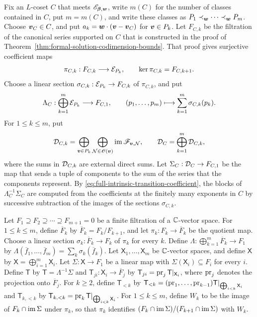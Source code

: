 Fix an \(L\)-coset \(C\) that meets \(\mathscr E_{\boldsymbol{\beta},\boldsymbol{w}}\), write \(m(C)\) for the number of classes contained in \(C\), put \(m=m(C)\), and write these classes as \(P_1\prec_{\boldsymbol{w}}\cdots\prec_{\boldsymbol{w}}P_m\).
Choose \(\boldsymbol{v}_C\in C\), and put \(a_k=\boldsymbol{w}\cdot(\boldsymbol{v}-\boldsymbol{v}_C)\) for \(\boldsymbol{v}\in P_k\).
Let \(F_{C,k}\) be the filtration of the canonical series supported on \(C\) that is constructed in the proof of Theorem~\ref{thm:formal-solution-codimension-bounds}.
That proof gives surjective coefficient maps
\begin{equation}
	\pi_{C,k}:F_{C,k}\longrightarrow
	\mathcal E_{P_k},
	\qquad
	\ker\pi_{C,k}=F_{C,k+1}.
	\label{eq:formal-transition-quotient-map}
\end{equation}
Choose a linear section \(\sigma_{C,k}:\mathcal E_{P_k}\to F_{C,k}\) of \(\pi_{C,k}\), and put
\begin{equation}
	\Lambda_C:
	\bigoplus_{k=1}^m\mathcal E_{P_k}
	\longrightarrow F_{C,1},
	\qquad
	(p_1,\ldots,p_m)
	\longmapsto
	\sum_{k=1}^m\sigma_{C,k}(p_k).
	\label{eq:formal-transition-lifting-map}
\end{equation}
For \(1\leq k\leq m\), put
\begin{equation}
	\mathcal D_{C,k}
	=
	\bigoplus_{\boldsymbol{v}\in P_k}
	\bigoplus_{\mathcal N\in\mathscr O(\boldsymbol{v})}
	\operatorname{im}\mathscr F_{\boldsymbol{v},\mathcal N},
	\qquad
	\mathcal D_C
	=
	\bigoplus_{k=1}^m\mathcal D_{C,k},
	\label{eq:formal-transition-source}
\end{equation}
where the sums in \(\mathcal D_{C,k}\) are external direct sums.
Let \(\Sigma_C:\mathcal D_C\to F_{C,1}\) be the map that sends a tuple of components to the sum of the series that the components represent.
By \eqref{eq:full-intrinsic-transition-coefficient}, the blocks of \(\Lambda_C^{-1}\Sigma_C\) are computed from the coefficients at the finitely many exponents in \(C\) by successive subtraction of the images of the sections \(\sigma_{C,k}\).

Let \(F_1\supseteq F_2\supseteq\cdots\supseteq F_{m+1}=0\) be a finite filtration of a \(\mathbb C\)-vector space.
For \(1\leq k\leq m\), define \(\overline F_k\) by \(\overline F_k=F_k/F_{k+1}\), and let \(\pi_k:F_k\to\overline F_k\) be the quotient map.
Choose a linear section \(\sigma_k:\overline F_k\to F_k\) of \(\pi_k\) for every \(k\).
Define \(\Lambda:\bigoplus_{k=1}^m\overline F_k\to F_1\) by \(\Lambda(\overline f_1,\ldots,\overline f_m)=\sum_k\sigma_k(\overline f_k)\).
Let \(\mathsf X_1,\ldots,\mathsf X_m\) be \(\mathbb C\)-vector spaces, and define \(\mathsf X\) by \(\mathsf X=\bigoplus_{i=1}^m\mathsf X_i\).
Let \(\Sigma:\mathsf X\to F_1\) be a linear map with \(\Sigma(\mathsf X_i)\subseteq F_i\) for every \(i\).
Define \(\mathsf T\) by \(\mathsf T=\Lambda^{-1}\Sigma\) and \(\mathsf T_{ji}:\mathsf X_i\to\overline F_j\) by \(\mathsf T_{ji}=\operatorname{pr}_j\mathsf T|_{\mathsf X_i}\), where \(\operatorname{pr}_j\) denotes the projection onto \(\overline F_j\).
For \(k\geq2\), define \(\mathsf T_{<k}\) by \(\mathsf T_{<k}=(\operatorname{pr}_1,\ldots,\operatorname{pr}_{k-1})\mathsf T|_{\bigoplus_{i<k}\mathsf X_i}\) and \(\mathsf T_{k,<k}\) by \(\mathsf T_{k,<k}=\operatorname{pr}_k\mathsf T|_{\bigoplus_{i<k}\mathsf X_i}\).
For \(1\leq k\leq m\), define \(W_k\) to be the image of \(F_k\cap\operatorname{im}\Sigma\) under \(\pi_k\), so that \(\pi_k\) identifies \((F_k\cap\operatorname{im}\Sigma)/(F_{k+1}\cap\operatorname{im}\Sigma)\) with \(W_k\).

